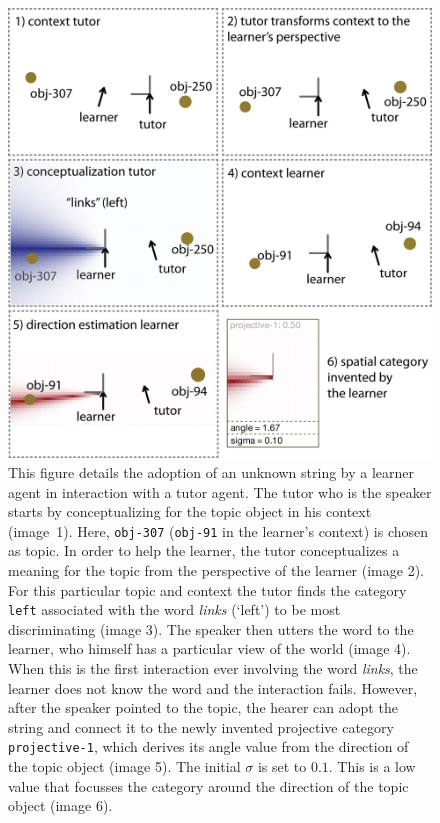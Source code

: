 \begin{figure}
\begin{center}
\includegraphics[width=0.75\columnwidth]{figs/category-acquisition-projective-single-category-acquisition.png}
\end{center}
\caption[Adoption of an unknown string]{This figure details the adoption of an unknown string by a learner agent in
interaction with a tutor agent. The tutor who is the speaker starts by conceptualizing for 
the topic object in his context (image~1). Here, {\footnotesize\tt obj-307} ({\footnotesize\tt obj-91} in the 
learner's context) is chosen as topic. In order to help the learner, the tutor conceptualizes 
a meaning for the topic from the perspective of the learner (image 2). For this
particular topic and context the tutor finds the category {\footnotesize\tt left}
associated with the word \textit{links} (`left') to be most discriminating (image 3). The speaker then
utters the word to the learner, who himself has a particular view of the world (image 4).
When this is the first interaction ever involving the word \textit{links}, the learner does not know
the word and the interaction fails. However, after the speaker pointed to the topic, the
hearer can adopt the string and connect it to the newly invented projective category
{\footnotesize\tt projective-1}, which derives its angle value from the direction of the topic object (image 5). 
The initial $\sigma$ is set to $0.1$. This is a low value that focusses the 
category around the direction of the topic object (image 6).}
\label{f:category-acquisition-projective-single-acquisition}
\end{figure}

